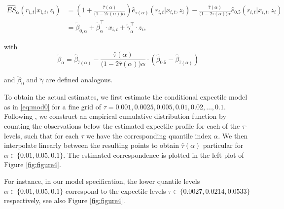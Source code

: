 \documentclass[11pt]{article}
\begin{document}
\begin{align}
\widehat{ES}_{\alpha}(r_{i,t}|x_{i,t},z_i) &= \left(1+\frac{\hat\tau(\alpha)}{\big(1-2\hat\tau(\alpha)\big)\alpha}\right)\hat e_{\hat\tau(\alpha)}(r_{i,t}|x_{i,t},z_i) - \frac{\hat\tau(\alpha)}{\big(1-2\hat\tau(\alpha)\big)\alpha}\hat e_{0.5}(r_{i,t}|x_{i,t},z_i)\nonumber\\
&=\tilde \beta_{0,\alpha} + \tilde\beta_{\alpha}^\top \cdot x_{i,t} + \tilde\gamma_\alpha^\top\cdot z_i,\label{eq:es}
\end{align}

with
\begin{equation}\tilde\beta_\alpha = \hat \beta_{\hat\tau(\alpha)} - \frac{\hat\tau(\alpha)}{\big(1-2\hat\tau(\alpha)\big)\alpha}\cdot \left(\hat\beta_{0.5} -\hat \beta_{\hat\tau(\alpha)}\right)\label{eq:tbeta}
\end{equation}

and \(\tilde\beta_0\) and \(\tilde\gamma\) are defined analogous.

To obtain the actual estimates, we first estimate the conditional expectile model as in \eqref{eq:mod0} for a fine grid of \(\tau = 0.001, 0.0025, 0.005,0.01,0.02,\ldots, 0.1\). Following \cite{Taylor2008}, we construct an empirical cumulative distribution function by counting the observations below the estimated expectile profile for each of the \(\tau\)-levels, such that for each \(\tau\) we have the corresponding quantile index \(\alpha\). We then interpolate linearly between the resulting points to obtain \(\hat\tau(\alpha)\) particular for \(\alpha\in\{0.01,0.05,0.1\}\). The estimated correspondence is plotted in the left plot of Figure \ref{fig:figure4}.

For instance, in our model specification, the lower quantile levels \(\alpha\in\{0.01,0.05,0.1\}\) correspond to the expectile levels \(\tau\in\{0.0027,0.0214,0.0533\}\) respectively, see also Figure \ref{fig:figure4}.
\end{document}
